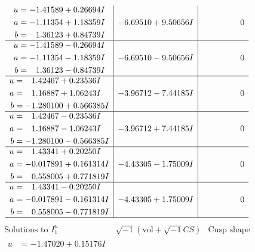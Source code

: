 \documentclass[1p]{elsarticle_modified}
\theoremstyle{definition}
\newcommand{\I}{\sqrt{-1}}
\begin{document}
$$\begin{array}{c|c|c}
\begin{aligned}
u &= -1.41589 + 0.26694 I \\
a &= -1.11354 + 1.18359 I \\
b &= \phantom{-}1.36123 + 0.84739 I\end{aligned}
 & -6.69510 + 9.50656 I & \phantom{-0.000000 } 0 \\ \hline\begin{aligned}
u &= -1.41589 - 0.26694 I \\
a &= -1.11354 - 1.18359 I \\
b &= \phantom{-}1.36123 - 0.84739 I\end{aligned}
 & -6.69510 - 9.50656 I & \phantom{-0.000000 } 0 \\ \hline\begin{aligned}
u &= \phantom{-}1.42467 + 0.23536 I \\
a &= \phantom{-}1.16887 + 1.06243 I \\
b &= -1.280100 + 0.566385 I\end{aligned}
 & -3.96712 - 7.44185 I & \phantom{-0.000000 } 0 \\ \hline\begin{aligned}
u &= \phantom{-}1.42467 - 0.23536 I \\
a &= \phantom{-}1.16887 - 1.06243 I \\
b &= -1.280100 - 0.566385 I\end{aligned}
 & -3.96712 + 7.44185 I & \phantom{-0.000000 } 0 \\ \hline\begin{aligned}
u &= \phantom{-}1.43341 + 0.20250 I \\
a &= -0.017891 + 0.161314 I \\
b &= \phantom{-}0.558005 + 0.771819 I\end{aligned}
 & -4.43305 - 1.75009 I & \phantom{-0.000000 } 0 \\ \hline\begin{aligned}
u &= \phantom{-}1.43341 - 0.20250 I \\
a &= -0.017891 - 0.161314 I \\
b &= \phantom{-}0.558005 - 0.771819 I\end{aligned}
 & -4.43305 + 1.75009 I & \phantom{-0.000000 } 0\\
 \hline 
 \end{array}$$\newpage$$\begin{array}{c|c|c}  
\text{Solutions to }I^u_{1}& \I (\text{vol} + \sqrt{-1}CS) & \text{Cusp shape}\\
 \hline 
\begin{aligned}
u &= -1.47020 + 0.15176 I \\

\end{aligned}
\end{array}$$
\end{document}
